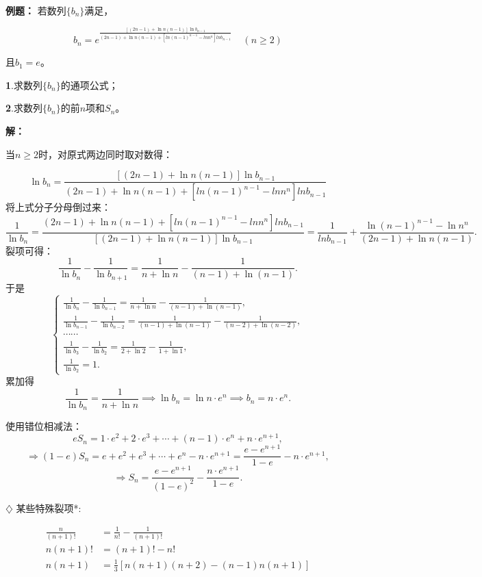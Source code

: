 \documentclass{article}
\begin{document}
\noindent\textbf{例题： } 
若数列$\{b_n\}$满足，

\large 
\[
b_n=e^{\frac{[(2n-1)+\ln n (n-1)]\ln b_{n-1}}{(2n-1)+\ln n (n-1)+[ln(n-1)^{n-1}-ln n^n]ln b_{n-1}}} \;\;\;\;(n\ge 2)
\]
\normalsize

且$b_1=e$。

\noindent\textbf 1.求数列$\{b_n\}$的通项公式；

\noindent\textbf 2.求数列$\{b_n\}$的前$n$项和$S_n$。


\noindent\textbf{解：}

当$n\ge 2$时，对原式两边同时取对数得：

\[
\ln b_n = \frac{[(2n-1)+\ln n (n-1)]\ln b_{n-1}}{(2n-1)+\ln n (n-1)+[ln(n-1)^{n-1}-ln n^n]ln b_{n-1}}
\]
将上式分子分母倒过来：
\[
\frac{1}{\ln b_n} = \frac{(2n-1)+\ln n (n-1)+[ln(n-1)^{n-1}-ln n^n]ln b_{n-1}}{[(2n-1)+\ln n (n-1)]\ln b_{n-1}} = \frac{1}{ln b_{n-1}}+\frac{\ln(n-1)^{n-1}-\ln n^n }{(2n-1)+\ln n (n-1)}.
\]
裂项可得：
\[
\frac{1}{\ln b_n} - \frac{1}{\ln b_{n+1}} = \frac{1}{n+\ln n} - \frac{1}{(n-1)+\ln(n-1)}.
\]
于是
\[
\begin{cases}
\frac{1}{\ln b_n} - \frac{1}{\ln b_{n-1}} = \frac{1}{n+\ln n} - \frac{1}{(n-1)+\ln(n-1)}, \\
\frac{1}{\ln b_{n-1}} - \frac{1}{\ln b_{n-2}} = \frac{1}{(n-1)+\ln(n-1)} - \frac{1}{(n-2)+\ln(n-2)}, \\
\cdots\cdots \\
\frac{1}{\ln b_3} - \frac{1}{\ln b_2} = \frac{1}{2+\ln 2} - \frac{1}{1+\ln 1}, \\
\frac{1}{\ln b_2} = 1.
\end{cases}
\]
累加得
\[
\frac{1}{\ln b_n} = \frac{1}{n+\ln n} \implies \ln b_n = \ln n \cdot e^n \implies b_n = n \cdot e^n.
\]

使用错位相减法：
\[
eS_n = 1\cdot e^2 + 2\cdot e^3 + \cdots + (n-1)\cdot e^n + n\cdot e^{n+1},
\]
\[
\Rightarrow (1-e)S_n = e + e^2 + e^3 + \cdots + e^n - n\cdot e^{n+1} = \frac{e-e^{n+1}}{1-e} - n\cdot e^{n+1},
\]
\[
\Rightarrow S_n = \frac{e-e^{n+1}}{(1-e)^2} - \frac{n\cdot e^{n+1}}{1-e}.
\]
\vspace{1\baselineskip}


$\diamondsuit$ 某些特殊裂项*:
\vspace{1\baselineskip}

\begin{align}
    \frac{n}{(n+1)!}&=\frac{1}{n!} - \frac{1}{(n+1)!}\\
    n(n+1)!&=(n+1)!-n!\\
    n(n+1)&=\frac{1}{3}[n(n+1)(n+2)-(n-1)n(n+1)]
\end{align}
\end{document}
